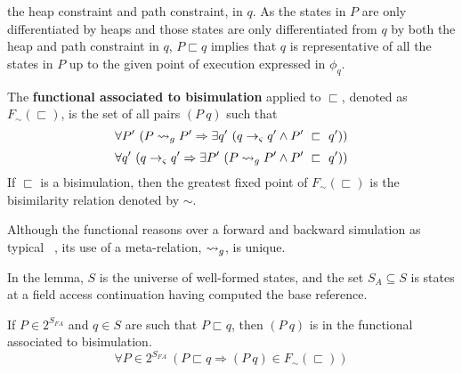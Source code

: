 the heap constraint and path constraint, in $q$. As the states in $P$
are only differentiated by heaps and those states are only
differentiated from $q$ by both the heap and path constraint in $q$,
$P \sqsubset q$ implies that $q$ is representative of all the states
in $P$ up to the given point of execution expressed in $\phi_q$.
\begin{definition}
\label{bisimulation}
The \textbf{functional associated to bisimulation} applied to $\sqsubset$, denoted as $F_\sim(\sqsubset)$, is the set of all pairs
$(P\ q)$ such that
\begin{equation}
\label{eqn:BisimulationForwards}
\forall P^\prime\ ( P \leadsto_{g} P^\prime \Rightarrow \exists q^\prime\ ( q \rightarrow_{\varsigma} q^\prime \wedge P^\prime\ \sqsubset\ q^\prime))
\end{equation}
\begin{equation}
\label{eqn:BisimulationBackwards}
\forall q^\prime\ ( q \rightarrow_{\varsigma} q^\prime\Rightarrow \exists P^\prime\ ( P \leadsto_{g} P^\prime \wedge P^\prime\ \sqsubset\ q^\prime))
\end{equation}
If $\sqsubset$ is a bisimulation, then the greatest fixed point of $F_\sim(\sqsubset)$ is the bisimilarity relation denoted by $\sim$.
\end{definition}
Although the functional reasons over a forward and backward
simulation as typical~ \cite{Sangiorgi:2011}, its use of a meta-relation, $\leadsto_{g}$, is unique. 

In the lemma, $S$ is the universe of well-formed states, and the
set $S_A \subseteq S$ is states at a field access continuation having computed the base reference.
\begin{lemma}
If $P \in 2^{S_\mathit{FA}}$ and $q \in S$ are such that $P \sqsubset q$, then $(P\ q)$ is in the functional associated to bisimulation.
\label{lem:access}
$$
\forall P \in 2^{S_\mathit{FA}}\ (P \sqsubset q \Rightarrow (P\ q) \in F_\sim(\sqsubset))
$$
\end{lemma}

